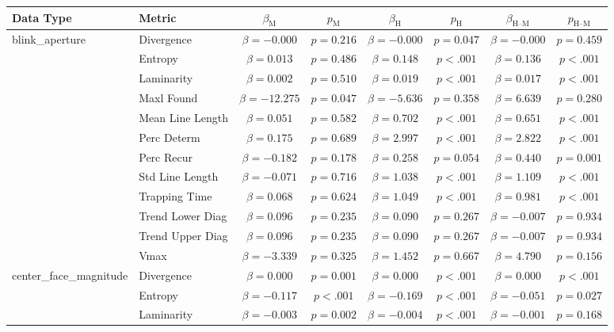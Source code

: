 \begin{tabular}{llcc|cc|cc}
\toprule
Data Type & Metric & $\beta_{\text{M}}$ & $p_{\text{M}}$ & $\beta_{\text{H}}$ & $p_{\text{H}}$ & $\beta_{\text{H--M}}$ & $p_{\text{H--M}}$ \\
\midrule
\multirow{12}{*}{blink_aperture} & Divergence & $\beta = -0.000$ & $p = 0.216$ & $\beta = -0.000$ & $p = 0.047$ & $\beta = -0.000$ & $p = 0.459$ \\
 & Entropy & $\beta = 0.013$ & $p = 0.486$ & $\beta = 0.148$ & $p < .001$ & $\beta = 0.136$ & $p < .001$ \\
 & Laminarity & $\beta = 0.002$ & $p = 0.510$ & $\beta = 0.019$ & $p < .001$ & $\beta = 0.017$ & $p < .001$ \\
 & Maxl Found & $\beta = -12.275$ & $p = 0.047$ & $\beta = -5.636$ & $p = 0.358$ & $\beta = 6.639$ & $p = 0.280$ \\
 & Mean Line Length & $\beta = 0.051$ & $p = 0.582$ & $\beta = 0.702$ & $p < .001$ & $\beta = 0.651$ & $p < .001$ \\
 & Perc Determ & $\beta = 0.175$ & $p = 0.689$ & $\beta = 2.997$ & $p < .001$ & $\beta = 2.822$ & $p < .001$ \\
 & Perc Recur & $\beta = -0.182$ & $p = 0.178$ & $\beta = 0.258$ & $p = 0.054$ & $\beta = 0.440$ & $p = 0.001$ \\
 & Std Line Length & $\beta = -0.071$ & $p = 0.716$ & $\beta = 1.038$ & $p < .001$ & $\beta = 1.109$ & $p < .001$ \\
 & Trapping Time & $\beta = 0.068$ & $p = 0.624$ & $\beta = 1.049$ & $p < .001$ & $\beta = 0.981$ & $p < .001$ \\
 & Trend Lower Diag & $\beta = 0.096$ & $p = 0.235$ & $\beta = 0.090$ & $p = 0.267$ & $\beta = -0.007$ & $p = 0.934$ \\
 & Trend Upper Diag & $\beta = 0.096$ & $p = 0.235$ & $\beta = 0.090$ & $p = 0.267$ & $\beta = -0.007$ & $p = 0.934$ \\
 & Vmax & $\beta = -3.339$ & $p = 0.325$ & $\beta = 1.452$ & $p = 0.667$ & $\beta = 4.790$ & $p = 0.156$ \\
\midrule
\multirow{12}{*}{center_face_magnitude} & Divergence & $\beta = 0.000$ & $p = 0.001$ & $\beta = 0.000$ & $p < .001$ & $\beta = 0.000$ & $p < .001$ \\
 & Entropy & $\beta = -0.117$ & $p < .001$ & $\beta = -0.169$ & $p < .001$ & $\beta = -0.051$ & $p = 0.027$ \\
 & Laminarity & $\beta = -0.003$ & $p = 0.002$ & $\beta = -0.004$ & $p < .001$ & $\beta = -0.001$ & $p = 0.168$ \\

\end{tabular}
